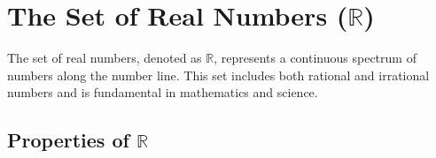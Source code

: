 \section{The Set of Real Numbers (\( \mathbb{R} \))}
The set of real numbers, denoted as \( \mathbb{R} \), represents a continuous spectrum of numbers along the number line. This set includes both rational and irrational numbers and is fundamental in mathematics and science.

\subsection{Properties of \( \mathbb{R} \)}
